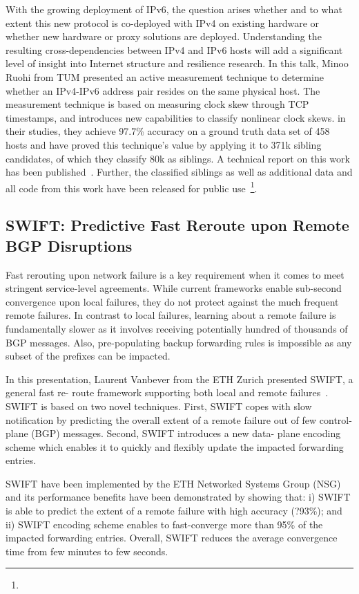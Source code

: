 With the growing deployment of IPv6, the question arises whether and to what extent this new protocol is co-deployed with IPv4 on existing hardware or whether new hardware or proxy solutions are deployed. Understanding the resulting cross-dependencies between IPv4 and IPv6 hosts will add a significant level of insight into Internet structure and resilience research. In this talk, Minoo Ruohi from TUM presented an active measurement technique to determine whether an IPv4-IPv6 address pair resides on the same physical host. The measurement technique is based on measuring clock skew through TCP timestamps, and introduces new capabilities to classify nonlinear clock skews. in their studies, they achieve 97.7\% accuracy on a ground truth data set of 458 hosts and have proved this technique's value by applying it to 371k sibling candidates, of which they classify 80k as siblings. A technical report on this work has been published~\cite{Scheitle2016}. Further, the classified siblings as well as additional data and all code from this work have been released for public use~\footnote{}.


\subsection{SWIFT: Predictive Fast Reroute upon Remote BGP Disruptions}

Fast rerouting upon network failure is a key requirement when it comes to meet stringent service-level agreements. While current frameworks enable sub-second convergence upon local failures, they do not protect against the much frequent remote failures. In contrast to local failures, learning about a remote failure is fundamentally slower as it involves receiving potentially hundred of thousands of BGP messages. Also, pre-populating backup forwarding rules is impossible as any subset of the prefixes can be impacted.

In this presentation, Laurent Vanbever from the ETH Zurich presented SWIFT, a general fast re- route framework supporting both local and remote failures~\cite{}. SWIFT is based on two novel techniques. First, SWIFT copes with slow notification by predicting the overall extent of a remote failure out of few control-plane (BGP) messages. Second, SWIFT introduces a new data- plane encoding scheme which enables it to quickly and flexibly update the impacted forwarding entries.

SWIFT have been implemented by the ETH Networked Systems Group (NSG) and its performance benefits have been demonstrated by showing that: i) SWIFT is able to predict the extent of a remote failure with high accuracy (?93\%); and ii) SWIFT encoding scheme enables to fast-converge more than 95\% of the impacted forwarding entries. Overall, SWIFT reduces the average convergence time from few minutes to few seconds.

